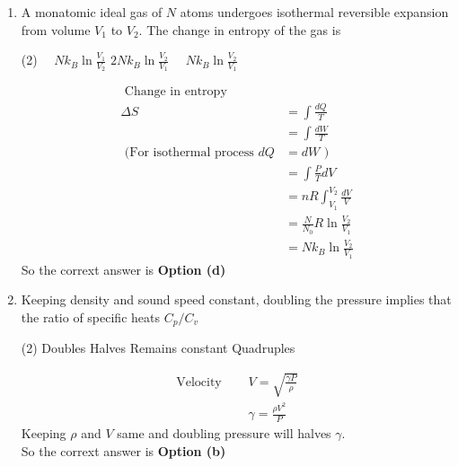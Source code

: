 \begin{enumerate}
 \begin{tasks}(4)
	\task[\textbf{a.}]$T_{1}^{2} / T_{2}$
	\task[\textbf{b.}]$\sqrt{T_{1} T_{2}}$
	\task[\textbf{c.}]$T_{2}^{2} / T_{1}$
	\task[\textbf{d.}] $\left(T_{1}+T_{2}\right) / 2$
\end{tasks}
\begin{answer}
		So the corrext answer is \textbf{Option (b)}
\end{answer}
\item A monatomic ideal gas of $N$ atoms undergoes isothermal reversible expansion from volume $V_{1}$ to $V_{2}$. The change in entropy of the gas is
 \begin{tasks}(2)
	\task[\textbf{b.}]$\quad N k_{B} \ln \frac{V_{1}}{V_{2}}$
	\task[\textbf{c.}] $2 N k_{B} \ln \frac{V_{2}}{V_{1}}$
	\task[\textbf{d.}]  $\quad N k_{B} \ln \frac{V_{2}}{V_{1}}$
\end{tasks}
\begin{answer}
	$$
	\begin{aligned}
	\text { Change in entropy }\\
	\Delta S &=\int \frac{d Q}{T} \\
	&=\int \frac{d W}{T}\\
	\text { (For isothermal process } d Q&=d W \text { ) }\\
	&=\int \frac{P}{T} d V \\
	&=n R \int_{V_{1}}^{V_{2}} \frac{d V}{V} \\
	&=\frac{N}{N_{0}} R \ln \frac{V_{2}}{V_{1}} \\
	&=N k_{B} \ln \frac{V_{2}}{V_{1}}
\end{aligned}
$$
	So the corrext answer is \textbf{Option (d)}
\end{answer}
\item Keeping density and sound speed constant, doubling the pressure implies that the ratio of specific heats $C_{p} / C_{v}$
 \begin{tasks}(2)
	\task[\textbf{a.}]Doubles
	\task[\textbf{b.}]Halves
	\task[\textbf{c.}]Remains constant
	\task[\textbf{d.}]Quadruples
\end{tasks}
\begin{answer}
	$$
	\begin{aligned}
	\text{Velocity }\quad &V=\sqrt{\frac{\gamma P}{\rho}} \\
	&\gamma=\frac{\rho V^{2}}{P}
\end{aligned}
$$
Keeping $\rho$ and $V$ same and doubling pressure will halves $\gamma$.\\
So the corrext answer is \textbf{Option (b)}

\end{answer}
\end{enumerate}
